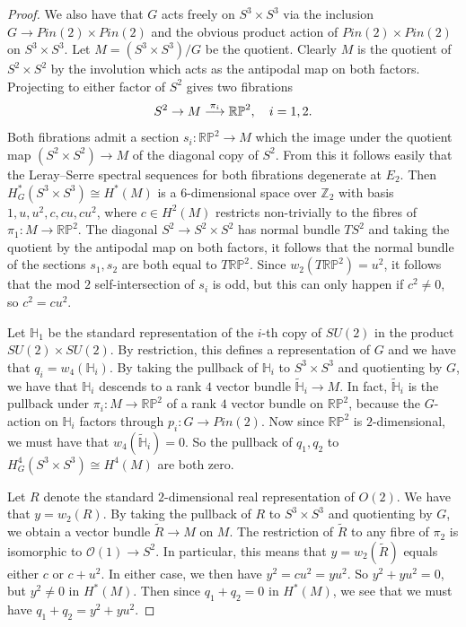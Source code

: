 \documentclass{amsart}
\theoremstyle{definition}
\theoremstyle{remark}
\numberwithin{equation}{section}
\begin{document}
\begin{proof}
We also have that $G$ acts freely on $S^3 \times S^3$ via the inclusion $G \to Pin(2) \times Pin(2)$ and the obvious product action of $Pin(2) \times Pin(2)$ on $S^3 \times S^3$. Let $M = (S^3 \times S^3)/G$ be the quotient. Clearly $M$ is the quotient of $S^2 \times S^2$ by the involution which acts as the antipodal map on both factors. Projecting to either factor of $S^2$ gives two fibrations
\[
S^2 \to M \buildrel \pi_i \over \longrightarrow \mathbb{RP}^2, \quad i = 1,2.
\]
Both fibrations admit a section $s_i : \mathbb{RP}^2 \to M$ which the image under the quotient map $(S^2 \times S^2) \to M$ of the diagonal copy of $S^2$. From this it follows easily that the Leray--Serre spectral sequences for both fibrations degenerate at $E_2$. Then $H^*_G( S^3 \times S^3) \cong H^*(M)$ is a $6$-dimensional space over $\mathbb{Z}_2$ with basis $1,u,u^2,c,cu,cu^2$, where $c \in H^2(M)$ restricts non-trivially to the fibres of $\pi_1 : M \to \mathbb{RP}^2$. The diagonal $S^2 \to S^2 \times S^2$ has normal bundle $TS^2$ and taking the quotient by the antipodal map on both factors, it follows that the normal bundle of the sections $s_1,s_2$ are both equal to $T\mathbb{RP}^2$. Since $w_2( T\mathbb{RP}^2) = u^2$, it follows that the mod $2$ self-intersection of $s_i$ is odd, but this can only happen if $c^2 \neq 0$, so $c^2 = cu^2$.

Let $\mathbb{H}_1$ be the standard representation of the $i$-th copy of $SU(2)$ in the product $SU(2) \times SU(2)$. By restriction, this defines a representation of $G$ and we have that $q_i = w_4( \mathbb{H}_i)$. By taking the pullback of $\mathbb{H}_i$ to $S^3 \times S^3$ and quotienting by $G$, we have that $\mathbb{H}_i$ descends to a rank $4$ vector bundle $\widetilde{\mathbb{H}}_i \to M$. In fact, $\widetilde{\mathbb{H}}_i$ is the pullback under $\pi_i : M \to \mathbb{RP}^2$ of a rank $4$ vector bundle on $\mathbb{RP}^2$, because the $G$-action on $\mathbb{H}_i$ factors through $p_i : G \to Pin(2)$. Now since $\mathbb{RP}^2$ is $2$-dimensional, we must have that $w_4(\widetilde{\mathbb{H}}_i) = 0$. So the pullback of $q_1,q_2$ to $H^4_{G}(S^3 \times S^3) \cong H^4(M)$ are both zero.

Let $R$ denote the standard $2$-dimensional real representation of $O(2)$. We have that $y = w_2(R)$. By taking the pullback of $R$ to $S^3 \times S^3$ and quotienting by $G$, we obtain a vector bundle $\widetilde{R} \to M$ on $M$. The restriction of $\widetilde{R}$ to any fibre of $\pi_2$ is isomorphic to $\mathcal{O}(1) \to S^2$. In particular, this means that $y = w_2(\widetilde{R})$ equals either $c$ or $c+u^2$. In either case, we then have $y^2 = cu^2 = yu^2$. So $y^2 + yu^2 = 0$, but $y^2 \neq 0$ in $H^*(M)$. Then since $q_1 + q_2 = 0$ in $H^*(M)$, we see that we must have $q_1 + q_2 = y^2 + yu^2$.

\end{proof}
\end{document}
